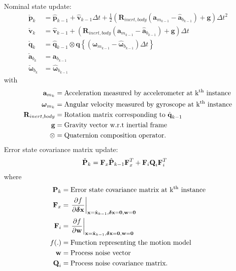 Nominal state update:
\begin{align}
    \check{\textbf{p}}_k &= \hat{\textbf{p}}_{k-1}+\hat{\textbf{v}}_{k-1}\Delta t + \frac{1}{2} \left( \textbf{R}_{inert,body}\left(\textbf{a}_{m_{k-1}}-\hat{\textbf{a}}_{b_{k-1}}\right)+\textbf{g}\right)\Delta t^2 \\
    \check{\textbf{v}}_k &= \hat{\textbf{v}}_{k-1}+\left(\textbf{R}_{inert,body}\left(\textbf{a}_{m_{k-1}}-\hat{\textbf{a}}_{b_{k-1}}\right)+\textbf{g}\right)\Delta t \\
    \check{\textbf{q}}_k &= \hat{\textbf{q}}_{k-1}\otimes \textbf{q}\left\{\left(\boldsymbol{\omega}_{m_{k-1}}-\hat{\boldsymbol{\omega}}_{b_{k-1}}\right)\Delta t\right\} \\
    \check{\textbf{a}}_{b_k} &= \hat{\textbf{a}}_{b_{k-1}} \\
    \check{\boldsymbol{\omega}}_{b_{k}} &= \hat{\boldsymbol{\omega}}_{b_{k-1}}
\end{align}
with
\begin{align}
	\textbf{a}_{m_{k}} &= \text{Acceleration measured by accelerometer at k\textsuperscript{th} instance}\\
	\boldsymbol{\omega}_{m_{k}} &= \text{Angular velocity measured by gyroscope at k\textsuperscript{th} instance}\\
    \textbf{R}_{inert,body} &= \text{Rotation matrix corresponding to $\hat{\textbf{q}}_{k-1}$} \\
	\textbf{g} &= \text{Gravity vector w.r.t inertial frame}\\
	\otimes &= \text{Quaternion composition operator.}
\end{align}
Error state covariance matrix update:
\begin{align}
    \Check{\textbf{P}}_k &= \textbf{F}_x\hat{\textbf{P}}_{k-1}\textbf{F}_x^T + \textbf{F}_i\textbf{Q}_i\textbf{F}_i^T
\end{align}
where
\begin{align}
	\textbf{P}_k &= \text{Error state covariance matrix at k\textsuperscript{th} instance}\\
	\textbf{F}_x &= \left.\frac{\partial f}{\partial \boldsymbol{\delta}\textbf{x}}\right|_{\textbf{x}=\hat{\textbf{x}}_{k-1} , \boldsymbol{\delta}\textbf{x}=\textbf{0} , \textbf{w}=\textbf{0}}\\
	\textbf{F}_i &= \left.\frac{\partial f}{\partial \textbf{w}}\right|_{\textbf{x}=\hat{\textbf{x}}_{k-1} , \boldsymbol{\delta}\textbf{x}=\textbf{0} , \textbf{w}=\textbf{0}}\\
	f(.) &= \text{Function representing the motion model}\\
	\textbf{w} &= \text{Process noise vector}\\
	\textbf{Q}_i &= \text{Process noise covariance matrix}.
\end{align}

